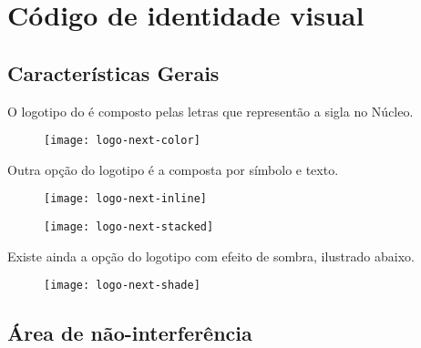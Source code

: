 \documentclass{manualmarca}
\begin{document}
\maketitle{}


\InicioDocumento{}

\chapter{Código de identidade visual}
\label{cha:codigo-de-identidade}

\section{Características Gerais}
\label{sec:caract-gerais}

O logotipo do \NExT{}  é composto pelas letras que representão a sigla no Núcleo.

\vspace*{1cm}
\begin{figure}[!htp]
  \centering
  \texttt{[image: logo-next-color]}
\end{figure}

\noindent Outra opção do logotipo é a composta por símbolo e texto.

\vspace*{1cm}
\begin{figure}[!htp]
  \centering
  \texttt{[image: logo-next-inline]}
\end{figure}
\vspace*{1cm}
\begin{figure}[!htp]
  \centering
  \texttt{[image: logo-next-stacked]}
\end{figure}

\noindent
Existe ainda a opção do logotipo com efeito de sombra, ilustrado abaixo.

\vspace*{1cm}
\begin{figure}[!htp]
  \centering
  \texttt{[image: logo-next-shade]}
\end{figure}

\pagebreak[4]

\section{Área de não-interferência}
\label{sec:area-de-nao}
\end{document}
